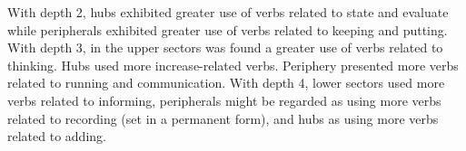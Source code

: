 \begin{itemize}
																																																																																																																																																																																																																																																																																																																																																																																			With depth 2, hubs exhibited greater use of verbs related to state and evaluate while
																																																																																																																																																																																																																																																																																																																																																																																					peripherals exhibited greater use of verbs related to keeping and putting.
																																																																																																																																																																																																																																																																																																																																																																																							With depth 3, in the upper sectors was found a greater use of verbs related to thinking.
																																																																																																																																																																																																																																																																																																																																																																																									Hubs used more increase-related verbs.
																																																																																																																																																																																																																																																																																																																																																																																											Periphery presented more verbs related to running and communication.
																																																																																																																																																																																																																																																																																																																																																																																													With depth 4, lower sectors used more verbs related to informing, peripherals might be regarded as using more verbs related to recording (set in a permanent form), and hubs as using more verbs related to adding.

\end{itemize}
